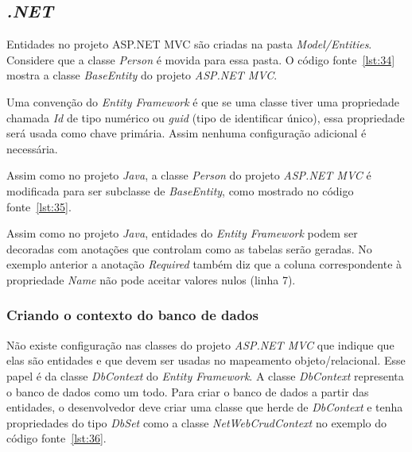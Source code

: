 \subsection{\textit{.NET}}

Entidades no projeto ASP.NET MVC são criadas na pasta \textit{Model/Entities}. Considere que a classe \textit{Person} é movida para essa pasta. O código fonte~\ref{lst:34} mostra a classe \textit{BaseEntity} do projeto \textit{ASP.NET MVC}.


Uma convenção do \textit{Entity Framework} é que se uma classe tiver uma propriedade chamada \textit{Id} de tipo numérico ou \textit{guid} (tipo de identificar único), essa propriedade será usada como chave primária. Assim nenhuma configuração adicional é necessária.

Assim como no projeto \textit{Java}, a classe \textit{Person} do projeto \textit{ASP.NET MVC} é modificada para ser subclasse de \textit{BaseEntity}, como mostrado no código fonte~\ref{lst:35}.


Assim como no projeto \textit{Java}, entidades do \textit{Entity Framework} podem ser decoradas com anotações que controlam como as tabelas serão geradas. No exemplo anterior a anotação \textit{Required} também diz que a coluna correspondente à propriedade \textit{Name} não pode aceitar valores nulos (linha 7).

\subsubsection{Criando o contexto do banco de dados}

Não existe configuração nas classes do projeto \textit{ASP.NET MVC} que indique que elas são entidades e que devem ser usadas no mapeamento objeto/relacional. Esse papel é da classe \textit{DbContext} do \textit{Entity Framework}. A classe \textit{DbContext} representa o banco de dados como um todo. Para criar o banco de dados a partir das entidades, o desenvolvedor deve criar uma classe que herde de \textit{DbContext} e tenha propriedades do tipo \textit{DbSet} como a classe \textit{NetWebCrudContext} no exemplo do código fonte~\ref{lst:36}. 


